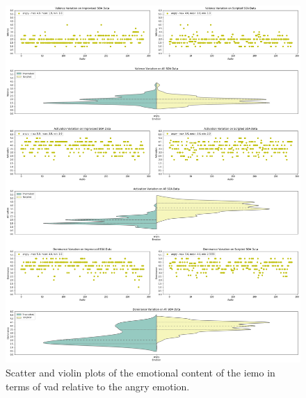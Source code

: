 \begin{figure}[H]
	\centering
	\includegraphics[width=\linewidth]{figs/appendix/IEMOCAP_data_study/angryScatterViolins.png}
	\caption{Scatter and violin plots of the emotional content of the \ac{iemo} in terms of \ac{vad} relative to the angry emotion.}
\end{figure}


